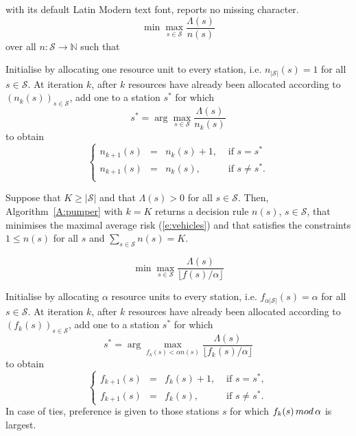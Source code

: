 \documentclass[10pt,a4paper]{amsart}
\begin{document}
with its default Latin Modern text font, reports no missing character.
\begin{equation}
\min\max_{s \in \mathcal{S}} \frac{\Lambda(s)}{n(s)}
\label{e:vehicles}
\end{equation}over all $n: \mathcal{S} \to \mathbb{N}$ such that 

\begin{algorithm}
Initialise by allocating one resource unit to every station,
i.e. $n_{|\mathcal{S}|}(s) = 1$ for all $s\in \mathcal{S}$.
At iteration $k$, after $k$ resources have already been 
allocated according to $(n_k(s))_{s\in\mathcal{S}}$, 
add one to a station $s^*$ for which 
\[
s^* = \arg\max_{s\in \mathcal{S}} \frac{\Lambda(s)}{n_k(s)}
\]
to obtain 
\[
\left\{ 
\begin{array}{llll}
    n_{k+1}(s) & = & n_k(s) + 1, & \mbox{ if } s = s^* \\
    n_{k+1}(s) & = & n_k(s), & \mbox{ if } s\neq s^*. \\
\end{array} 
\right.
\]
\label{A:pumper}
\end{algorithm}

\begin{theorem} \label{t:cars}
Suppose that $K \geq |\mathcal{S}|$ and that $\Lambda(s) > 0$
for all $s\in \mathcal{S}$. Then, Algorithm~\ref{A:pumper} with
$k=K$ returns a decision rule $n(s)$, $s\in \mathcal{S}$, that 
minimises the maximal average risk (\ref{e:vehicles}) and that 
satisfies the constraints  $1\leq n(s)$ for all $s$ and 
$\sum_{s\in\mathcal{S}} n(s) = K$.
\end{theorem}

\begin{equation}
\min\max_{s \in \mathcal{S}} \frac{\Lambda(s)}
{ \lfloor f(s)/\alpha \rfloor}
\label{e:humans}
\end{equation}

\begin{algorithm}
Initialise by allocating $\alpha$ resource units to every station,
i.e. $f_{\alpha |\mathcal{S}|}(s) = \alpha$ for all $s\in \mathcal{S}$.
At iteration $k$, after $k$ resources have already been 
allocated according to $(f_k(s))_{s\in\mathcal{S}}$, 
add one to a station $s^*$ for which 
\[
s^* = \arg\max_{ f_k(s) < \alpha n(s)} 
  \frac{\Lambda(s)}{ \lfloor f_k(s)/ \alpha \rfloor}
\]
to obtain 
\[
\left\{ \begin{array}{llll}
    f_{k+1}(s) & = & f_k(s) + 1,  & \mbox{ if } s = s^*, \\
    f_{k+1}(s) & = & f_k(s), & \mbox{ if } s\neq s^*.
\end{array} \right.
\]
In case of ties, preference is given to those stations
$s$ for which $f_k(s) \, \rm{mod} \, \alpha$ is largest.
\label{A:men}
\end{algorithm}
\end{document}

